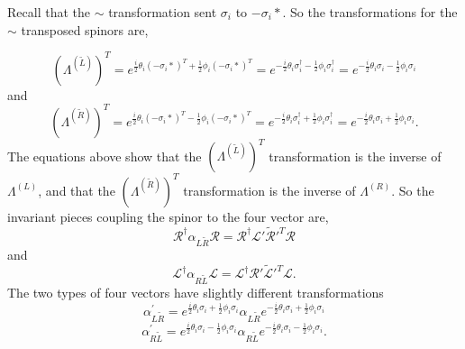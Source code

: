 Recall that the $\sim$ transformation sent $\sigma_i$ to $-\sigma_i*$. So the transformations for the $\sim$ transposed spinors are,

\begin{equation}
(\Lambda^{(\tilde{L})})^T = e^{\frac{i}{2}\theta_i(-\sigma_i*)^T + \frac{1}{2}\phi_i (-\sigma_i*)^T} 
= e^{-\frac{i}{2}\theta_i \sigma_i^\dagger - \frac{1}{2}\phi_i \sigma_i^\dagger} = e^{-\frac{i}{2}\theta_i \sigma_i - \frac{1}{2}\phi_i \sigma_i}
\end{equation}
and
\begin{equation}
(\Lambda^{(\tilde{R})})^T = e^{\frac{i}{2}\theta_i(-\sigma_i*)^T - \frac{1}{2}\phi_i (-\sigma_i*)^T} 
= e^{-\frac{i}{2}\theta_i \sigma_i^\dagger + \frac{1}{2}\phi_i \sigma_i^\dagger} = e^{-\frac{i}{2}\theta_i \sigma_i + \frac{1}{2}\phi_i \sigma_i}.
\end{equation}
The equations above show that the $(\Lambda^{(\tilde{L})})^T$ transformation is the inverse of $\Lambda^{(L)}$, and that the $(\Lambda^{(\tilde{R})})^T$ transformation is the inverse of $\Lambda^{(R)}$. So the invariant pieces coupling the spinor to the four vector are,
\begin{equation}
\mathcal{R}^\dagger \alpha_{L\tilde{R}} \mathcal{R} = \mathcal{R}^\dagger \mathcal{L}' \tilde{\mathcal{R}}'^{T} \mathcal{R}
\end{equation}
and
\begin{equation}
\mathcal{L}^\dagger \alpha_{R\tilde{L}} \mathcal{L} = \mathcal{L}^\dagger \mathcal{R}' \tilde{\mathcal{L}}'^{T} \mathcal{L}.
\end{equation}
The two types of four vectors have slightly different transformations
\begin{equation}
\alpha_{L\tilde{R}}^{'} = e^{\frac{i}{2}\theta_i \sigma_i + \frac{1}{2}\phi_i \sigma_i} 
\alpha_{L\tilde{R}} e^{-\frac{i}{2}\theta_i \sigma_i + \frac{1}{2}\phi_i \sigma_i}
\end{equation}
\begin{equation}
\alpha_{R\tilde{L}}^{'} = e^{\frac{i}{2}\theta_i \sigma_i - \frac{1}{2}\phi_i \sigma_i} 
\alpha_{R\tilde{L}} e^{-\frac{i}{2}\theta_i \sigma_i - \frac{1}{2}\phi_i \sigma_i}.
\end{equation}

